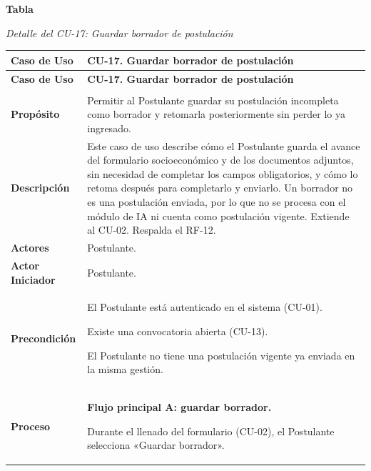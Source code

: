 \label{tab:detalle_cu17}
\noindent\textbf{Tabla~\thetable}\par\nopagebreak
\noindent\textit{Detalle del CU-17: Guardar borrador de postulación}\par\nopagebreak
\begingroup\small\linespread{1}\selectfont
\begin{longtable}{>{\raggedright\arraybackslash}p{2.9cm} >{\raggedright\arraybackslash}p{12.6cm}}
\toprule
\textbf{Caso de Uso} & \textbf{CU-17. Guardar borrador de postulación} \\
\midrule
\endfirsthead
\toprule
\textbf{Caso de Uso} & \textbf{CU-17. Guardar borrador de postulación} \\
\midrule
\endhead
\endfoot
\bottomrule
\multicolumn{2}{l}{\textit{Nota.} Elaboración propia.} \\
\endlastfoot
\textbf{Propósito} & Permitir al Postulante guardar su postulación incompleta como borrador y retomarla posteriormente sin perder lo ya ingresado. \\
\midrule
\textbf{Descripción} & Este caso de uso describe cómo el Postulante guarda el avance del formulario socioeconómico y de los documentos adjuntos, sin necesidad de completar los campos obligatorios, y cómo lo retoma después para completarlo y enviarlo. Un borrador no es una postulación enviada, por lo que no se procesa con el módulo de IA ni cuenta como postulación vigente. Extiende al CU-02. Respalda el RF-12. \\
\midrule
\textbf{Actores} & Postulante. \\
\midrule
\textbf{Actor Iniciador} & Postulante. \\
\midrule
\textbf{Precondición} & \vspace{-\baselineskip}\begin{cuvin}
    \item El Postulante está autenticado en el sistema (CU-01).
    \item Existe una convocatoria abierta (CU-13).
    \item El Postulante no tiene una postulación vigente ya enviada en la misma gestión.
\end{cuvin} \\
\midrule
\textbf{Proceso} & \textbf{Flujo principal A: guardar borrador.}
\begin{cupasos}
    \item Durante el llenado del formulario (CU-02), el Postulante selecciona «Guardar borrador».

\end{cupasos}
\end{longtable}
